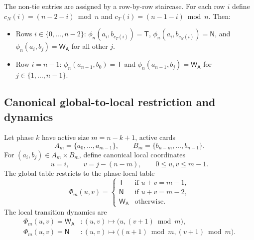 \documentclass[11pt]{article}
\theoremstyle{definition}
\theoremstyle{remark}
\newcommand{\WA}{\mathsf{W_A}}
\newcommand{\TT}{\mathsf{T}}
\newcommand{\NN}{\mathsf{N}}
\begin{document}
The non-tie entries are assigned by a row-by-row staircase. For each row $i$ define
$c_N(i) = (n - 2 - i) \bmod n$ and $c_T(i) = (n - 1 - i) \bmod n$. Then:
\begin{itemize}[nosep]
\item Rows $i \in \{0, \dots, n - 2\}$: $\phi_n(a_i, b_{c_T(i)}) = \TT$, $\phi_n(a_i, b_{c_N(i)}) = \NN$, and
$\phi_n(a_i, b_j) = \WA$ for all other $j$.
\item Row $i = n - 1$: $\phi_n(a_{n-1}, b_0) = \TT$ and $\phi_n(a_{n-1}, b_j) = \WA$ for $j \in \{1, \dots, n - 1\}$.
\end{itemize}

\subsection{Canonical global-to-local restriction and dynamics}
Let phase $k$ have active size $m = n-k+1$, active cards
\[
A_m = \{a_0,\dots,a_{m-1}\},\qquad
B_m = \{b_{n-m},\dots,b_{n-1}\}.
\]
For $(a_i,b_j)\in A_m\times B_m$, define canonical local coordinates
\[
u=i,\qquad v=j-(n-m),\qquad 0\le u,v\le m-1.
\]
The global table restricts to the phase-local table
\[
\Phi_m(u,v)=
\begin{cases}
\TT & \text{if } u+v=m-1,\\
\NN & \text{if } u+v=m-2,\\
\WA & \text{otherwise}.
\end{cases}
\]
The local transition dynamics are
\[
\begin{aligned}
\Phi_m(u,v)=\WA &: (u,v)\mapsto\bigl(u,(v+1)\bmod m\bigr),\\
\Phi_m(u,v)=\NN &: (u,v)\mapsto\bigl((u+1)\bmod m,(v+1)\bmod m\bigr).
\end{aligned}
\]
\end{document}
